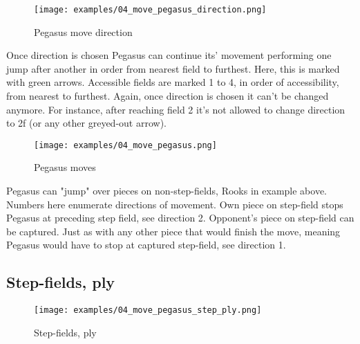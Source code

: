\clearpage %

\noindent
\begin{figure}[!t]
\texttt{[image: examples/04\_move\_pegasus\_direction.png]}
\caption{Pegasus move direction}
\label{fig:04_move_pegasus_direction}
\end{figure}
Once direction is chosen Pegasus can continue its' movement performing one jump
after another in order from nearest field to furthest. Here, this is marked
with green arrows. Accessible fields are marked 1 to 4, in order of accessibility,
from nearest to furthest. Again, once direction is chosen it can't be changed anymore.
For instance, after reaching field 2 it's not allowed to change direction to 2f (or
any other greyed-out arrow).

\clearpage %

\noindent
\begin{figure}[!t]
\texttt{[image: examples/04\_move\_pegasus.png]}
\caption{Pegasus moves}
\label{fig:04_move_pegasus}
\end{figure}
Pegasus can "jump" over pieces on non-step-fields, Rooks in example above. Numbers
here enumerate directions of movement. Own piece on step-field stops Pegasus at
preceding step field, see direction 2. Opponent's piece on step-field can be captured.
Just as with any other piece that would finish the move, meaning Pegasus would have to
stop at captured step-field, see direction 1.

\clearpage %

\subsection*{Step-fields, ply}

\noindent
\begin{figure}[!h]
\texttt{[image: examples/04\_move\_pegasus\_step\_ply.png]}
\caption{Step-fields, ply}
\label{fig:04_move_pegasus_step_ply}
\end{figure}

